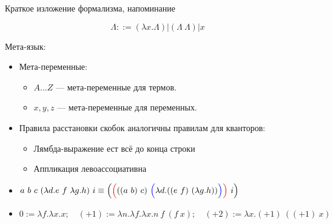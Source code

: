 \documentclass[aspectratio=169]{beamer}
\begin{document}
\begin{frame}{Краткое изложение формализма, напоминание}

$$\Lambda ::= (\lambda x.\Lambda) | (\Lambda\ \Lambda) | x$$

Мета-язык: 
\begin{itemize}
\item Мета-переменные:\begin{itemize}
\item $A\dots Z$ --- мета-переменные для термов. 
\item $x,y,z$ --- мета-переменные для переменных. 
\end{itemize}

\item Правила расстановки скобок аналогичны правилам для кванторов:
\begin{itemize}
\item Лямбда-выражение ест всё до конца строки
\item Аппликация левоассоциативна
\end{itemize}
\end{itemize}

\begin{exm}
\begin{itemize}
\item $a\ b\ c\ (\lambda d.e\ f\ \lambda g.h)\ i \equiv \Big({\color{red}\Big(}((a\ b)\ c)\ {\color{blue}\Big(}\lambda d.((e\ f)\ (\lambda g.h)){\color{blue}\Big)}{\color{red}\Big)}\ i\Big)$
\item $0 := \lambda f.\lambda x.x;\quad(+1) := \lambda n.\lambda f.\lambda x.n\ f\ (f\ x);\quad(+2) := \lambda x.(+1)\ ((+1)\ x)$
\end{itemize}
\end{exm}
\end{frame}
\end{document}
